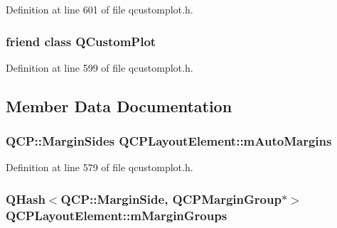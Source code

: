 Definition at line 601 of file qcustomplot.\-h.

\hypertarget{class_q_c_p_layout_element_a1cdf9df76adcfae45261690aa0ca2198}{
\subsubsection[{Q\-Custom\-Plot}]{\setlength{\rightskip}{0pt plus 5cm}friend class {\bf Q\-Custom\-Plot}\hspace{0.3cm}{\ttfamily [friend]}}}\label{class_q_c_p_layout_element_a1cdf9df76adcfae45261690aa0ca2198}


Definition at line 599 of file qcustomplot.\-h.



\subsection{Member Data Documentation}
\hypertarget{class_q_c_p_layout_element_af61c70354d1275778d68206b2a1b2d36}{
\subsubsection[{m\-Auto\-Margins}]{\setlength{\rightskip}{0pt plus 5cm}Q\-C\-P\-::\-Margin\-Sides Q\-C\-P\-Layout\-Element\-::m\-Auto\-Margins\hspace{0.3cm}{\ttfamily [protected]}}}\label{class_q_c_p_layout_element_af61c70354d1275778d68206b2a1b2d36}


Definition at line 579 of file qcustomplot.\-h.

\hypertarget{class_q_c_p_layout_element_aeafbbc1130e02eee663c5326761fc963}{
\subsubsection[{m\-Margin\-Groups}]{\setlength{\rightskip}{0pt plus 5cm}Q\-Hash$<${\bf Q\-C\-P\-::\-Margin\-Side}, {\bf Q\-C\-P\-Margin\-Group}$\ast$$>$ Q\-C\-P\-Layout\-Element\-::m\-Margin\-Groups\hspace{0.3cm}{\ttfamily [protected]}}}\label{class_q_c_p_layout_element_aeafbbc1130e02eee663c5326761fc963}


